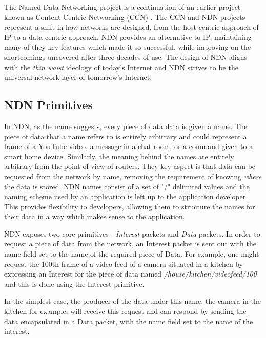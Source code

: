 The Named Data Networking project is a continuation of an earlier project known as Content-Centric Networking (CCN) \cite{vj-named-content}. The CCN and NDN projects represent a shift in how networks are designed, from the host-centric approach of IP to a data centric approach. NDN provides an alternative to IP, maintaining many of they key features which made it so successful, while improving on the shortcomings uncovered after three decades of use. The design of NDN aligns with the \textit{thin waist} ideology of today's Internet and NDN strives to be the universal network layer of tomorrow's Internet. 



\subsection{NDN Primitives}
In NDN, as the name suggests, every piece of data data is given a name. The piece of data that a name refers to is entirely arbitrary and could represent a frame of a YouTube video, a message in a chat room, or a command given to a smart home device. Similarly, the meaning behind the names are entirely arbitrary from the point of view of routers. They key aspect is that data can be requested from the network by name, removing the requirement of knowing \textit{where} the data is stored. NDN names consist of a set of "/" delimited values and the naming scheme used by an application is left up to the application developer. This provides flexibility to developers, allowing them to structure the names for their data in a way which makes sense to the application.

NDN exposes two core primitives - \textit{Interest} packets and \textit{Data} packets. In order to request a piece of data from the network, an Interest packet is sent out with the name field set to the name of the required piece of Data. For example, one might request the 100th frame of a video feed of a camera situated in a kitchen by expressing an Interest for the piece of data named \textit{/house/kitchen/videofeed/100} and this is done using the Interest primitive.

In the simplest case, the producer of the data under this name, the camera in the kitchen for example, will receive this request and can respond by sending the data encapsulated in a Data packet, with the name field set to the name of the interest.

